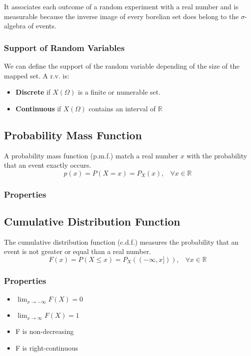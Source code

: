 It associates each outcome of a random experiment with a real number and is
measurable because the inverse image of every borelian set does belong to the
$\sigma$-algebra of events.

\subsubsection{Support of Random Variables}
We can define the support of the random variable depending of the size of the
mapped set. A r.v. is:
\begin{itemize}
    \item \textbf{Discrete} if $X(\Omega)$ is a finite or numerable set.
    \item \textbf{Continuous} if $X(\Omega)$ contains an interval of
    $\mathbb{R}$
\end{itemize}

\subsection{Probability Mass Function}
A probability mass function (p.m.f.) match a real number $x$ with the
probability that an event exactly occurs.
\[ p(x)=P(X=x)=P_X(x),\;\;\; \forall x\in \mathbb{R} \]

\subsubsection{Properties}

\subsection{Cumulative Distribution Function}
The cumulative distribution function (c.d.f.) measures the probability that an
event is not greater or equal than a real number.
\[ F(x) = P(X\leq x) = P_X((-\infty,x])),\;\;\; \forall x \in \mathbb{R} \]

\subsubsection{Properties}
\begin{itemize}
    \item $\lim_{x \rightarrow -\infty} F(X) = 0$
    \item $\lim_{x \rightarrow \infty} F(X) = 1$
    \item F is non-decreasing
    \item F is right-continuous
\end{itemize}

